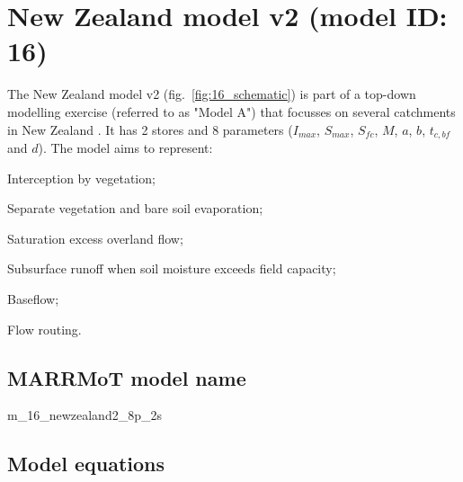 \section{New Zealand model v2 (model ID: 16)}
The New Zealand model v2 (fig.~\ref{fig:16_schematic}) is part of a top-down modelling exercise (referred to as "Model A") that focusses on several catchments in New Zealand \citep{Atkinson2003}. It has 2 stores and 8 parameters ($I_{max}$, $S_{max}$, $S_{fc}$, $M$, $a$, $b$, $t_{c,bf}$ and $d$). The model aims to represent:

\begin{itemizecompact}
\item Interception by vegetation;
\item Separate vegetation and bare soil evaporation;
\item Saturation excess overland flow;
\item Subsurface runoff when soil moisture exceeds field capacity;
\item Baseflow;
\item Flow routing.
\end{itemizecompact}

\subsection{MARRMoT model name}
m\_16\_newzealand2\_8p\_2s \\

\subsection{Model equations}

